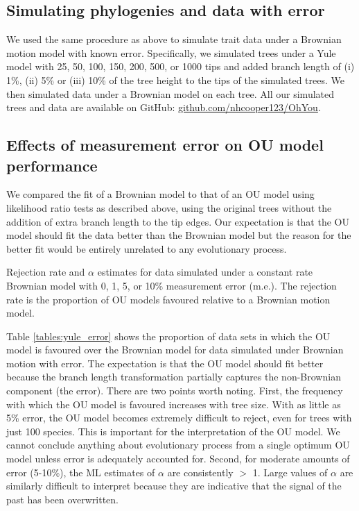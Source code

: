 \documentclass[a4paper,12pt]{article}
\begin{document}
  \subsection{Simulating phylogenies and data with error}
    We used the same procedure as above to simulate trait data under a Brownian motion model with known error. 
    Specifically, we simulated trees under a Yule model with 25, 50, 100, 150, 200, 500, or 1000 tips and added branch length of (i) 1\%, (ii) 5\% or (iii) 10\% of the tree height to the tips of the simulated trees. 
    We then simulated data under a Brownian model on each tree. 
    All our simulated trees and data are available on GitHub: \href{https://github.com/nhcooper123/OhYou}{github.com/nhcooper123/OhYou}.

  \subsection{Effects of measurement error on OU model performance}
    We compared the fit of a Brownian model to that of an OU model using likelihood ratio tests as described above, using the original trees without the addition of extra branch length to the tip edges. 
    Our expectation is that the OU model should fit the data better than the Brownian model but the reason for the better fit would be entirely unrelated to any evolutionary process. 

  \begin{landscape}
      \begin{table}[!htbp]
        \begin{center}
        \caption{Rejection rate and $\alpha$ estimates for data simulated under a constant rate Brownian model with 0, 1, 5, or 10\% measurement error (m.e.). The rejection rate is the proportion of OU models favoured relative to a Brownian motion model.}
        \bigskip
        
        \label{tables:yule_error}
        \end{center}
      \end{table}
  \end{landscape}

    Table \ref{tables:yule_error} shows the proportion of data sets in which the OU model is favoured over the Brownian model for data simulated under Brownian motion with error. The expectation is that the OU model should fit better because the branch length transformation partially captures the non-Brownian component (the error). There are two points worth noting. First, the frequency with which the OU model is favoured increases with tree size. With as little as 5\% error, the OU model becomes extremely difficult to reject, even for trees with just 100 species. This is important for the interpretation of the OU model. We cannot conclude anything about evolutionary process from a single optimum OU model unless error is adequately accounted for. Second, for moderate amounts of error (5-10\%), the ML estimates of $\alpha$ are consistently $>$ 1. Large values of $\alpha$ are similarly difficult to interpret because they are indicative that the signal of the past has been overwritten. 
\end{document}

